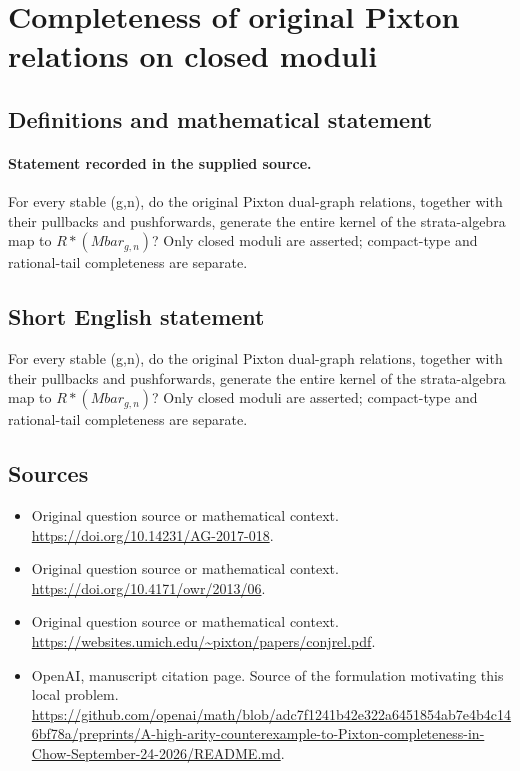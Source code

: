 \documentclass[11pt]{article}
\begin{document}
\section*{Completeness of original Pixton relations on closed moduli}\label{30007054}
\subsection{Definitions and mathematical statement}
\paragraph{Statement recorded in the supplied source.}
For every stable (g,n), do the original Pixton dual-graph relations, together with their pullbacks and pushforwards, generate the entire kernel of the strata-algebra map to $R*(Mbar_{g,n})$? Only closed moduli are asserted; compact-type and rational-tail completeness are separate.
\subsection{Short English statement}
For every stable (g,n), do the original Pixton dual-graph relations, together with their pullbacks and pushforwards, generate the entire kernel of the strata-algebra map to $R*(Mbar_{g,n})$? Only closed moduli are asserted; compact-type and rational-tail completeness are separate.
\subsection{Sources}
\begin{itemize}
\item[S1] Original question source or mathematical context.
\url{https://doi.org/10.14231/AG-2017-018}.
\item[S2] Original question source or mathematical context.
\url{https://doi.org/10.4171/owr/2013/06}.
\item[S3] Original question source or mathematical context.
\url{https://websites.umich.edu/~pixton/papers/conjrel.pdf}.
\item[S4] OpenAI, manuscript citation page. Source of the formulation motivating this local problem.
\url{https://github.com/openai/math/blob/adc7f1241b42e322a6451854ab7e4b4c146bf78a/preprints/A-high-arity-counterexample-to-Pixton-completeness-in-Chow-September-24-2026/README.md}.
\end{itemize}
\end{document}

